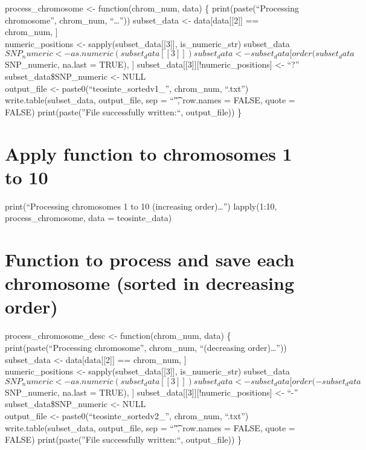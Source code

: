 \documentclass[
]{article}
\begin{document}
process\_chromosome \textless- function(chrom\_num, data) \{
print(paste(``Processing chromosome'', chrom\_num, ``\ldots{}''))
subset\_data \textless- data{[}data{[}{[}2{]}{]} == chrom\_num, {]}\\
numeric\_positions \textless- sapply(subset\_data{[}{[}3{]}{]},
is\_numeric\_str)
subset\_data\(SNP_numeric <- as.numeric(subset_data[[3]])
  subset_data <- subset_data[order(subset_data\)SNP\_numeric, na.last =
TRUE), {]} subset\_data{[}{[}3{]}{]}{[}!numeric\_positions{]} \textless-
``?'' subset\_data\$SNP\_numeric \textless- NULL\\
output\_file \textless- paste0(``teosinte\_sortedv1\_'', chrom\_num,
``.txt'') write.table(subset\_data, output\_file, sep = ``\t", row.names
= FALSE, quote = FALSE) print(paste(''File successfully written:``,
output\_file)) \}

\section{Apply function to chromosomes 1 to
10}\label{apply-function-to-chromosomes-1-to-10-2}

print(``Processing chromosomes 1 to 10 (increasing order)\ldots{}'')
lapply(1:10, process\_chromosome, data = teosinte\_data)

\section{Function to process and save each chromosome (sorted in
decreasing
order)}\label{function-to-process-and-save-each-chromosome-sorted-in-decreasing-order-1}

process\_chromosome\_desc \textless- function(chrom\_num, data) \{
print(paste(``Processing chromosome'', chrom\_num, ``(decreasing
order)\ldots{}'')) subset\_data \textless- data{[}data{[}{[}2{]}{]} ==
chrom\_num, {]}\\
numeric\_positions \textless- sapply(subset\_data{[}{[}3{]}{]},
is\_numeric\_str)
subset\_data\(SNP_numeric <- as.numeric(subset_data[[3]])
  subset_data <- subset_data[order(-subset_data\)SNP\_numeric, na.last =
TRUE), {]} subset\_data{[}{[}3{]}{]}{[}!numeric\_positions{]} \textless-
``-'' subset\_data\$SNP\_numeric \textless- NULL\\
output\_file \textless- paste0(``teosinte\_sortedv2\_'', chrom\_num,
``.txt'') write.table(subset\_data, output\_file, sep = ``\t", row.names
= FALSE, quote = FALSE) print(paste(''File successfully written:``,
output\_file)) \}
\end{document}
